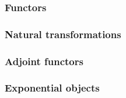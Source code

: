 \subsubsection*{Functors}


\subsubsection*{Natural transformations}


\subsubsection*{Adjoint functors}


\subsubsection*{Exponential objects}
